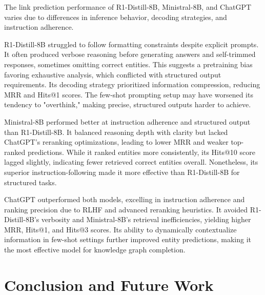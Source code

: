 \documentclass[12pt,a4paper]{article}
\newcommand{\modelministral}{Ministral-8B\xspace}
\newcommand{\modeldeepseek}{R1-Distill-8B\xspace}
\begin{document}
The link prediction performance of \modeldeepseek, \modelministral, and ChatGPT varies due to differences in inference behavior, decoding strategies, and instruction adherence.

\modeldeepseek struggled to follow formatting constraints despite explicit prompts. It often produced verbose reasoning before generating answers and self-trimmed responses, sometimes omitting correct entities. This suggests a pretraining bias favoring exhaustive analysis, which conflicted with structured output requirements. Its decoding strategy prioritized information compression, reducing MRR and Hits@1 scores. The few-shot prompting setup may have worsened its tendency to "overthink," making precise, structured outputs harder to achieve.

\modelministral performed better at instruction adherence and structured output than \modeldeepseek. It balanced reasoning depth with clarity but lacked ChatGPT's reranking optimizations, leading to lower MRR and weaker top-ranked predictions. While it ranked entities more consistently, its Hits@10 score lagged slightly, indicating fewer retrieved correct entities overall. Nonetheless, its superior instruction-following made it more effective than \modeldeepseek for structured tasks.

ChatGPT outperformed both models, excelling in instruction adherence and ranking precision due to RLHF and advanced reranking heuristics. It avoided \modeldeepseek's verbosity and \modelministral's retrieval inefficiencies, yielding higher MRR, Hits@1, and Hits@3 scores. Its ability to dynamically contextualize information in few-shot settings further improved entity predictions, making it the most effective model for knowledge graph completion.

%
%


\section{Conclusion and Future Work}\label{sec:conclusion-and-future-work}


\end{document}
